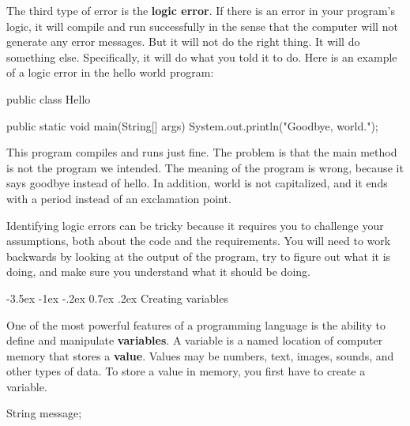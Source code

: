 \documentclass[12pt]{book}
\makeatletter
\theoremstyle{exercise}
\renewcommand{\section}{\@startsection {section}{1}{\z@}%
    {-3.5ex \@plus -1ex \@minus -.2ex}%
    {0.7ex \@plus.2ex}%
    {\normalfont\Large\bfseries}}
\makeatother
\begin{document}

The third type of error is the {\bf logic error}.
If there is an error in your program's logic, it will compile and run successfully in the sense that the computer will not generate any error messages.
But it will not do the right thing.
It will do something else.
Specifically, it will do what you told it to do.
Here is an example of a logic error in the hello world program:

\begin{code}
public class Hello {

    public static void main(String[] args) {
        System.out.println("Goodbye, world.");
    }

}
\end{code}

This program compiles and runs just fine.
The problem is that the main method is not the program we intended.
The meaning of the program is wrong, because it says goodbye instead of hello.
In addition, world is not capitalized, and it ends with a period instead of an exclamation point.

Identifying logic errors can be tricky because it requires you to challenge your assumptions, both about the code and the requirements.
You will need to work backwards by looking at the output of the program, try to figure out what it is doing, and make sure you understand what it should be doing.


\section{Creating variables}


One of the most powerful features of a programming language is the ability to define and manipulate {\bf variables}.
A variable is a named location of computer memory that stores a {\bf value}.
Values may be numbers, text, images, sounds, and other types of data.
To store a value in memory, you first have to create a variable.

\begin{code}
    String message;
\end{code}

\end{document}
